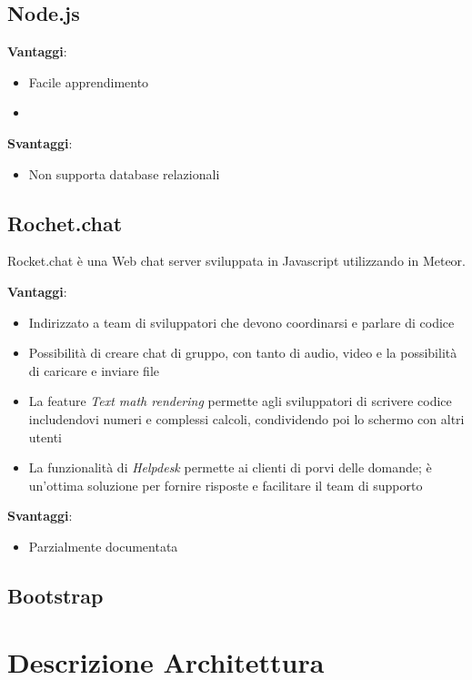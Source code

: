 \subsection{Node.js}

\textbf{Vantaggi}: 
\begin{itemize}
	\item Facile apprendimento
	\item 
\end{itemize}

\textbf{Svantaggi}: 
\begin{itemize}
	\item Non supporta database relazionali
	
\end{itemize}

\subsection{Rochet.chat}

Rocket.chat è una Web chat server sviluppata in Javascript utilizzando in  Meteor.

\textbf{Vantaggi}: 
\begin{itemize}
\item Indirizzato a team di sviluppatori che devono coordinarsi e parlare di codice
\item Possibilità di creare chat di gruppo, con tanto di audio, video e la possibilità di caricare e inviare file
\item La feature \textit{Text math rendering} permette agli sviluppatori di scrivere codice includendovi numeri e complessi calcoli, condividendo poi lo schermo con altri utenti	
\item La funzionalità di \textit{Helpdesk} permette ai clienti di porvi delle domande; è un’ottima soluzione per fornire risposte e facilitare il team di supporto
\end{itemize}

\textbf{Svantaggi}: 
\begin{itemize}
	\item Parzialmente documentata
\end{itemize}

\subsection{Bootstrap}

\section{Descrizione Architettura}
